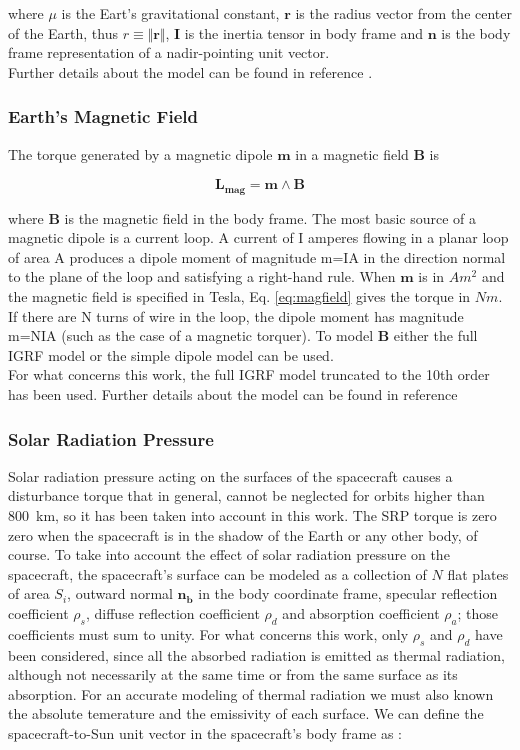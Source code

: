 where $\mu$ is the Eart's gravitational constant, $\textbf{r}$ is the radius vector from the center of the Earth, thus $r \equiv \Vert{\textbf{r}}\Vert$, $\textbf{I}$ is the inertia tensor in body frame and $\textbf{n}$ is the body frame representation of a nadir-pointing unit vector.\\
Further details about the model can be found in reference \cite{Markley2014}.

\subsubsection{Earth's Magnetic Field}
The torque generated by a magnetic dipole $\textbf{m}$ in a magnetic field $\textbf{B}$ is

\begin{equation}
 \mathbf{L_{mag}} = \mathbf{m} \wedge \mathbf{B}
 \label{eq:magfield}
\end{equation}

where $\mathbf{B}$ is the magnetic field in the body frame.
The most basic source of a magnetic dipole is a current loop. A current of I amperes flowing in a planar loop of area A produces a dipole moment of magnitude m=IA in the direction normal to the plane of the loop and satisfying a right-hand rule.
When $\textbf{m}$ is in $Am^2$ and the magnetic field is specified in Tesla, Eq. \ref{eq:magfield} gives the torque in $Nm$. If there are N turns of wire in the loop, the dipole moment has magnitude m=NIA (such as the case of a magnetic torquer).
To model $\textbf{B}$ either the full IGRF model or the simple dipole model can be used.\\
For what concerns this work, the full IGRF model truncated to the 10th order has been used. Further details about the model can be found in reference \cite{Davis2014}

\subsubsection{Solar Radiation Pressure}
Solar radiation pressure acting on the surfaces of the spacecraft causes a disturbance torque that in general, cannot be neglected for orbits higher than \SI{800}{\kilo\meter}, so it has been taken into account in this work.
The SRP torque is zero zero when the spacecraft is in the shadow of the Earth or any other body, of course.
To take into account the effect of solar radiation pressure on the spacecraft, the spacecraft's surface can be modeled as a collection of $N$ flat plates of area $S_{i}$, outward normal $\mathbf{n_{b}}$ in the body coordinate frame, specular reflection coefficient $\rho_s$, diffuse reflection coefficient $\rho_{d}$ and absorption coefficient $\rho_{a}$; those coefficients must sum to unity.
For what concerns this work, only $\rho_s$ and $\rho_d$ have been considered, since all the absorbed radiation is emitted as thermal radiation,  although not necessarily at the same time or from the same surface as its absorption.
For an accurate modeling of thermal radiation we must also known the absolute temerature and the emissivity of each surface.
We can define the spacecraft-to-Sun unit vector in the spacecraft's body frame as : 

